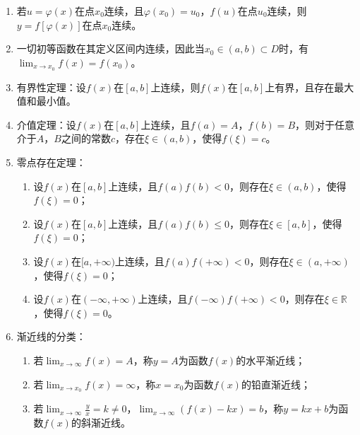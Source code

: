 \documentclass[UTF8]{ctexart}
\theoremstyle{remark}
\begin{document}
\begin{enumerate}
				\item 若$u = \varphi(x)$在点$x_0$连续，且$\varphi(x_0) = u_0$，$f(u)$在点$u_0$连续，则$y = f[\varphi(x)]$在点$x_0$连续。
				
				\item 一切初等函数在其定义区间内连续，因此当$x_0 \in (a,b) \subset D$时，有$\lim_{x \to x_0} f(x) = f(x_0)$。
				
				\item 有界性定理：设$f(x)$在$[a,b]$上连续，则$f(x)$在$[a,b]$上有界，且存在最大值和最小值。
				
				\item 介值定理：设$f(x)$在$[a,b]$上连续，且$f(a)=A$，$f(b)=B$，则对于任意介于$A$，$B$之间的常数$c$，存在$\xi \in (a,b)$，使得$f(\xi)=c$。
				
				\item 零点存在定理：
				\begin{enumerate}
					\item 设$f(x)$在$[a,b]$上连续，且$f(a)f(b)<0$，则存在$\xi \in (a,b)$，使得$f(\xi)=0$；
					\item 设$f(x)$在$[a,b]$上连续，且$f(a)f(b) \leq 0$，则存在$\xi \in [a,b]$，使得$f(\xi)=0$；
					\item 设$f(x)$在$[a,+\infty)$上连续，且$f(a)f(+\infty)<0$，则存在$\xi \in (a,+\infty)$，使得$f(\xi)=0$；
					\item 设$f(x)$在$(-\infty,+\infty)$上连续，且$f(-\infty)f(+\infty)<0$，则存在$\xi \in \mathbb{R}$，使得$f(\xi)=0$。
				\end{enumerate}
				
				\item 渐近线的分类：
				\begin{enumerate}
					\item 若$\lim_{x \to \infty} f(x) = A$，称$y=A$为函数$f(x)$的水平渐近线；
					\item 若$\lim_{x \to x_0} f(x) = \infty$，称$x=x_0$为函数$f(x)$的铅直渐近线；
					\item 若$\lim_{x \to \infty} \frac{y}{x} = k \neq 0$，$\lim_{x \to \infty} (f(x)-kx) = b$，称$y=kx+b$为函数$f(x)$的斜渐近线。
				\end{enumerate}
				

\end{enumerate}
\end{document}
